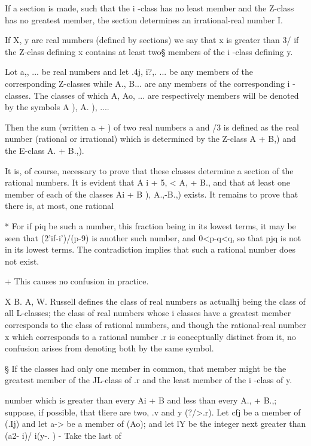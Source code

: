 If a section is made, such that the i -class has no least member and
the Z-class has no greatest member, the section determines an
irrational-real number I.

If X, y are real numbers (defined by sections) we say that x is
greater than 3/ if the Z-class defining x contains at least two§
members of the i -class defining y.

Lot a,, ... be real numbers and let .4j, i?,. ... be any members of
the corresponding Z-classes while A., B... are any members of the
corresponding i -classes. The classes of which A, Ao, ... are
respectively members will be denoted by the symbols A ), A. ), ....

Then the sum (written a + ) of two real numbers a and /3 is defined as
the real number (rational or irrational) which is determined by the
Z-class A + B,) and the E-class A. + B.,).

It is, of course, necessary to prove that these classes determine a
section of the rational numbers. It is evident that A i + 5, < A, +
B., and that at least one member of each of the classes Ai + B ),
A.,-\-B.,) exists. It remains to prove that there is, at most, one
rational

* For if piq be such a number, this fraction being in its lowest
terms, it may be seen that (2'if-i')/(p-9) is another such number, and
0<p-q<q, so that pjq is not in its lowest terms. The contradiction
implies that such a rational number does not exist.

+ This causes no confusion in practice.

X B. A, W. Russell defines the class of real numbers as actualhj being
the class of all L-classes; the class of real numbers whose i classes
have a greatest member corresponds to the class of rational numbers,
and though the rational-real number x which corresponds to a rational
number .r is conceptually distinct from it, no confusion arises from
denoting both by the same symbol.

§ If the classes had only one member in common, that member might be
the greatest member of the JL-class of .r and the least member of the
i -class of y.

%
%

number which is greater than every Ai + B and less than every A., +
B.,; suppose, if possible, that tliere are two, .v and y (?/>.r). Let
cfj be a member of (.Ij) and let a-> be a member of (Ao); and let lY
be the integer next greater than (a2- i)/ i(y-. ) - Take the last of

